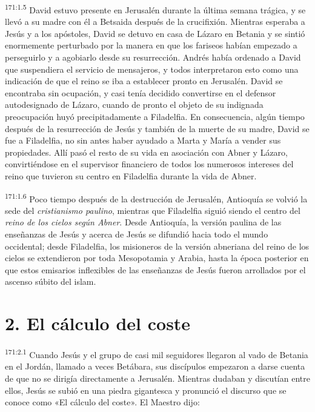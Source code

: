 \par 
\textsuperscript{171:1.5} David estuvo presente en Jerusalén durante la última semana trágica, y se llevó a su madre con él a Betsaida después de la crucifixión. Mientras esperaba a Jesús y a los apóstoles, David se detuvo en casa de Lázaro en Betania y se sintió enormemente perturbado por la manera en que los fariseos habían empezado a perseguirlo y a agobiarlo desde su resurrección. Andrés había ordenado a David que suspendiera el servicio de mensajeros, y todos interpretaron esto como una indicación de que el reino se iba a establecer pronto en Jerusalén. David se encontraba sin ocupación, y casi tenía decidido convertirse en el defensor autodesignado de Lázaro, cuando de pronto el objeto de su indignada preocupación huyó precipitadamente a Filadelfia. En consecuencia, algún tiempo después de la resurrección de Jesús y también de la muerte de su madre, David se fue a Filadelfia, no sin antes haber ayudado a Marta y María a vender sus propiedades. Allí pasó el resto de su vida en asociación con Abner y Lázaro, convirtiéndose en el supervisor financiero de todos los numerosos intereses del reino que tuvieron su centro en Filadelfia durante la vida de Abner.

\par 
\textsuperscript{171:1.6} Poco tiempo después de la destrucción de Jerusalén, Antioquía se volvió la sede del \textit{cristianismo paulino}, mientras que Filadelfia siguió siendo el centro del \textit{reino de los cielos según Abner}. Desde Antioquía, la versión paulina de las enseñanzas de Jesús y acerca de Jesús se difundió hacia todo el mundo occidental; desde Filadelfia, los misioneros de la versión abneriana del reino de los cielos se extendieron por toda Mesopotamia y Arabia, hasta la época posterior en que estos emisarios inflexibles de las enseñanzas de Jesús fueron arrollados por el ascenso súbito del islam.

\section*{2. El cálculo del coste}
\par 
\textsuperscript{171:2.1} Cuando Jesús y el grupo de casi mil seguidores llegaron al vado de Betania en el Jordán, llamado a veces Betábara, sus discípulos empezaron a darse cuenta de que no se dirigía directamente a Jerusalén. Mientras dudaban y discutían entre ellos, Jesús se subió en una piedra gigantesca y pronunció el discurso que se conoce como «El cálculo del coste». El Maestro dijo:

